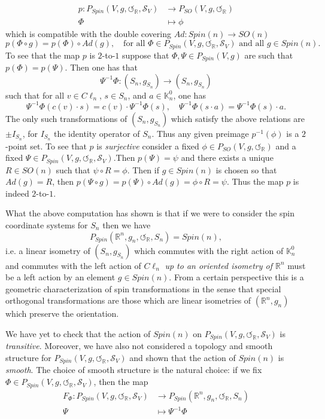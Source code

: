 \documentclass[openany, 11pt]{article}
\theoremstyle{definition}
\theoremstyle{remark}
\def\Sc{\ensuremath{\mathscr{S}}}
\def\cal{\ensuremath{\boldsymbol{\circlearrowleft}}}
\def\bR{\ensuremath{\mathbb{R}}}
\def\bK{\ensuremath{\mathbb{K}}}
\begin{document}
\begin{align*}
    p:P_{Spin}(V,g,\cal_{\bR},\Sc_V)&\longrightarrow P_{SO}(V,g,\cal_{\bR})\\
    \Phi&\longmapsto \phi
\end{align*}
which is compatible with the double covering $Ad:Spin(n)\rightarrow SO(n)$ 
\[
    p(\Phi\circ g)=p(\Phi)\circ Ad(g),\quad \text{for all }\Phi\in P_{Spin}(V,g,\cal_{\bR},\Sc_V)\text{ and all }g\in Spin(n).
\]
To see that the map $p$ is $2$-to-$1$ suppose that $\Phi,\Psi\in P_{Spin}(V,g)$ are such that $p(\Phi)=p(\Psi)$. Then one has that 
\[
    \Psi^{-1}\Phi:(S_n,g_{S_n})\rightarrow (S_n,g_{S_n})
\]
such that for all $v\in C\ell_n$, $s\in S_n$, and $a\in \bK^0_n$, one has
\[
    \Psi^{-1}\Phi(c(v)\cdot s)=c(v)\cdot\Psi^{-1}\Phi(s),\quad \Psi^{-1}\Phi(s\cdot a)=\Psi^{-1}\Phi(s)\cdot a.
\]
The only such transformations of $(S_n,g_{S_n})$ which satisfy the above relations are $\pm I_{S_n}$, for $I_{S_n}$ the identity operator of $S_n$. Thus any given preimage $p^{-1}(\phi)$ is a $2$-point set. To see that $p$ is \emph{surjective} consider a fixed $\phi\in P_{SO}(V,g,\cal_{\bR})$ and a fixed $\Psi\in P_{Spin}(V,g,\cal_{\bR},\Sc_V)$.Then $p(\Psi)=\psi$ and there exists a unique $R\in SO(n)$ such that $\psi\circ R=\phi$. Then if $g\in Spin(n)$ is chosen so that $Ad(g)=R$, then $p(\Psi\circ g)=p(\Psi)\circ Ad(g)=\phi\circ R=\psi$. Thus the map $p$ is indeed $2$-to-$1$. \par 
What the above computation has shown is that if we were to consider the spin coordinate systems for $S_n$ then we have 
\[
    P_{Spin}(\bR^n,g_n,\cal_{\bR},S_n)=Spin(n),
\]
i.e. a linear isometry of $(S_n,g_{S_n})$ which commutes with the right action of $\bK^0_n$ and commutes with the left action of $C\ell_n$ \emph{up to an oriented isometry of $\bR^n$} must be a left action by an element $g\in Spin(n)$. From a certain perspective this is a geometric characterization of spin transformations in the sense that special orthogonal transformations are those which are linear isometries of $(\bR^n,g_n)$ which preserve the orientation.\par
We have yet to check that the action of $Spin(n)$ on $P_{Spin}(V,g,\cal_{\bR},\Sc_V)$ is \emph{transitive}. Moreover, we have also not considered a topology and smooth structure for $P_{Spin}(V,g,\cal_{\bR},\Sc_V)$ and shown that the action of $Spin(n)$ is \emph{smooth}. The choice of smooth structure is the natural choice: if we fix $\Phi\in P_{Spin}(V,g,\cal_{\bR},\Sc_V)$, then the map
\begin{align*}
    F_{\Phi}:P_{Spin}(V,g,\cal_{\bR},\Sc_V)&\rightarrow P_{Spin}(\bR^n,g_n,\cal_{\bR},S_n)\\
    \Psi&\mapsto \Psi^{-1}\Phi
\end{align*}
\end{document}
